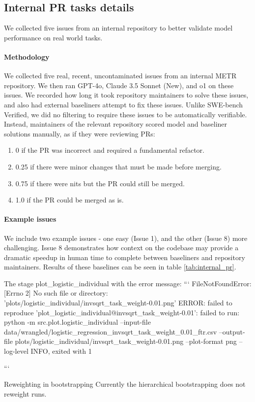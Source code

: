 \documentclass{article}
\begin{document}
\subsection{Internal PR tasks details} \label{internalprtasksdetails}
We collected five issues from an internal repository to better validate model performance on real world tasks.

\paragraph{Methodology} We collected five real, recent, uncontaminated issues from an internal METR repository.
We then ran GPT-4o, Claude 3.5 Sonnet (New), and o1 on these issues.
We recorded how long it took repository maintainers to solve these issues, and also had external baseliners attempt to fix these issues.
Unlike SWE-bench Verified, we did no filtering to require these issues to be automatically verifiable. 
Instead, maintainers of the relevant repository scored model and baseliner solutions manually, as if they were reviewing PRs:

\begin{enumerate}
\item 0 if the PR was incorrect and required a fundamental refactor.
\item 0.25 if there were minor changes that must be made before merging.
\item 0.75 if there were nits but the PR could still be merged.
\item 1.0 if the PR could be merged as is.
\end{enumerate}


\paragraph{Example issues} 
We include two example issues - one easy (Issue 1), and the other (Issue 8) more challenging. Issue 8 demonstrates how context on the codebase may provide a dramatic speedup in human time to complete between baseliners and repository maintainers. Results of these baselines can be seen in table \ref{tab:internal_pr}.

\begin{taskprompt}[Issue 1]{1.0\textwidth}{0pt}
The stage plot_logistic_individual with the error message:
```
FileNotFoundError: [Errno 2] No such file or directory: 
'plots/logistic_individual/invsqrt_task_weight-0.01.png'
ERROR: failed to reproduce 'plot_logistic_individual@invsqrt_task_weight-0.01': 
failed to run: python -m src.plot.logistic_individual --input-file data/wrangled/logistic_regression_invsqrt_task_weight_0.01_ftr.csv 
--output-file plots/logistic_individual/invsqrt_task_weight-0.01.png 
--plot-format png --log-level INFO, exited with 1
		
```
\end{taskprompt}
\begin{taskprompt}[Issue 8]{1.0\textwidth}{0pt}
Reweighting in bootstrapping
Currently the hierarchical bootstrapping does not reweight runs.    
\end{taskprompt}
\end{document}

